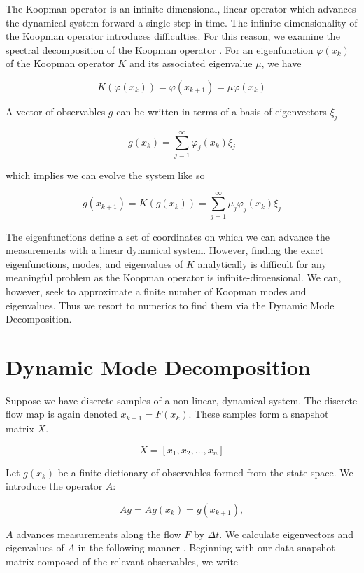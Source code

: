 \vspace{0.12cm}

The Koopman operator is an infinite-dimensional, linear operator which advances
the dynamical system forward a single step in time. The infinite dimensionality
of the Koopman operator introduces difficulties. For this reason, we examine
the spectral decomposition of the Koopman operator \cite{doi:10.1137/1.9781611974508}.
 For an eigenfunction $\varphi(x_k)$ of the Koopman operator $K$ and its associated eigenvalue $\mu$, we have 


$$
K(\varphi(x_k)) = \varphi(x_{k+1}) = \mu \varphi(x_k) 
$$

\noindent  A vector of observables $g$ can be written in terms of a basis of eigenvectors $\xi_j$

$$
g(x_{k}) = \sum^{\infty}_{j=1}\varphi_j(x_k) \xi_j
$$

\noindent which implies we can evolve the system like so

$$
g(x_{k+1}) = K(g(x_k)) = \sum^{\infty}_{j=1} \mu_j \varphi_j(x_k) \xi_j
$$

\noindent The eigenfunctions define a set of coordinates on which we can advance the measurements with a 
linear dynamical system.
 However, finding the exact eigenfunctions, modes, and eigenvalues of $K$ analytically
is difficult for any meaningful problem as the Koopman operator is infinite-dimensional. We can, however, seek to approximate
a finite number of Koopman modes and eigenvalues. Thus we resort to
numerics to find them via the Dynamic Mode Decomposition.


\section{Dynamic Mode Decomposition}
Suppose we have discrete samples of a non-linear, dynamical system. The discrete flow map
is again denoted $x_{k+1}= F(x_k)$. These samples form a snapshot matrix $X$.

$$
X = [x_1,x_2,\dots,x_n]
$$

\noindent Let $g(x_k)$ be a finite dictionary of observables formed from the state space. 
We introduce the operator $A$:

$$
A g = A g(x_k) = g(x_{k+1}),
$$

\noindent $A$ advances measurements along the flow $F$ by $\Delta t$.
We calculate eigenvectors and eigenvalues of $A$ in the following manner \cite{brunton2021modern}.
Beginning with our data snapshot matrix composed of the relevant observables, we write

